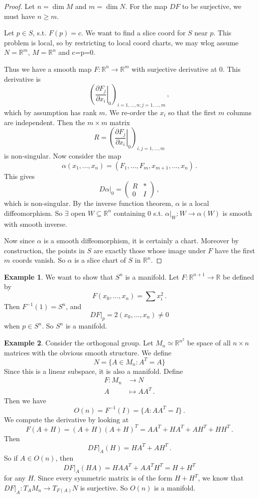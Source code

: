 \documentclass[a4paper,11pt]{article}
\theoremstyle{definition}
\newtheorem*{ex}{Example}
\numberwithin{equation}{section}
\begin{document}
\begin{proof}
Let $n=\dim M$ and $m=\dim N$. For the map $DF$ to be surjective, we must have $n\geq m$.

Let $p\in S$, s.t. $F(p)=c$. We want to find a slice coord for $S$ near $p$. This problem is local, so by restricting to local coord charts, we may wlog assume $N=\mathbb{R}^m$, $M=\mathbb{R}^n$ and c=p=0.

Thus we have a smooth map $F:\mathbb{R}^n\rightarrow\mathbb{R}^m$ with surjective derivative at 0. This derivative is
\[
\left(\left.\frac{\partial F_j}{\partial x_i}\right|_0\right)_{i=1,...,n;j=1,...,m}\,,
\]
which by assumption has rank $m$. We re-order the $x_i$ so that the first $m$ columns are independent. Then the $m\times m$ matrix
\[
R=\left(\left.\frac{\partial F_j}{\partial x_i}\right|_0\right)_{i,j=1,...,m}
\]
is non-singular. Now consider the map
\[
\alpha(x_1,...,x_n)=(F_1,...,F_m,x_{m+1},...,x_n)\,.
\]
This gives
\[
D\alpha|_0=\begin{pmatrix}
R & *\\
0 & I
\end{pmatrix}\,,
\]
which is non-singular. By the inverse function theorem, $\alpha$ is a local diffeomorphism. So $\exists$ open $W\subseteq\mathbb{R}^n$ containing 0 s.t. $\alpha|_W:W\rightarrow \alpha(W)$ is smooth with smooth inverse.

Now since $\alpha$ is a smooth diffeomorphism, it is certainly a chart. Moreover by construction, the points in $S$ are exactly those whose image under $F$ have the first $m$ coords vanish. So $\alpha$ is a slice chart of $S$ in $\mathbb{R}^n$.
\end{proof}

\begin{ex}
We want to show that $S^n$ is a manifold. Let $F:\mathbb{R}^{n+1}\rightarrow\mathbb{R}$ be defined by
\[
F(x_0,...,x_n)=\sum x_i^2\,.
\]
Then $F^{-1}(1)=S^n$, and
\[
DF|_p=2(x_0,...,x_n)\neq0
\]
when $p\in S^n$. So $S^n$ is a manifold.
\end{ex}

\begin{ex}
Consider the orthogonal group. Let $M_n\simeq\mathbb{R}^{n^2}$ be space of all $n\times n $ matrices with the obvious smooth structure. We define
\[
N=\{A\in M_n: A^T=A\}
\]
Since this is a linear subspace, it is also a manifold. Define
\begin{align*}
    F:M_n&\rightarrow N\\
    A&\mapsto AA^T\,.
\end{align*}
Then we have
\[
O(n)=F^{-1}(I)=\{A:AA^T=I\}\,.
\]
We compute the derivative by looking at
\[
F(A+H)=(A+H)(A+H)^T=AA^T+HA^T+AH^T+HH^T\,.
\]
Then
\[
DF|_A(H)=HA^T+AH^T\,.
\]
So if $A\in O(n)$, then
\[
DF|_A(HA)=HAA^T+AA^TH^T=H+H^T
\]
for any $H$. Since every symmetric matrix is of the form $H+H^T$, we know that $DF|_A:T_AM_n\rightarrow T_{F(A)}N$ is surjective. So $O(n)$ is a manifold.
\end{ex}
\end{document}

